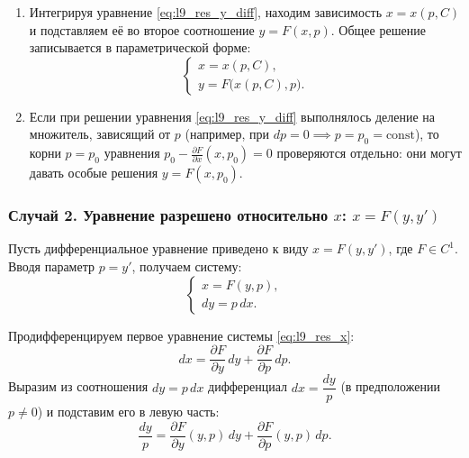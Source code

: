 \begin{enumerate}
    \item Интегрируя уравнение \eqref{eq:l9_res_y_diff}, находим зависимость
    $x = x(p, C)$ и подставляем её во второе соотношение $y = F(x, p)$. Общее
    решение записывается в параметрической форме:
    \begin{equation} \label{eq:l9_res_y_ans}
        \begin{cases}
            x = x(p, C), \\
            y = F\bigl(x(p, C), p\bigr).
        \end{cases} \tag{9}
    \end{equation}
    \item Если при решении уравнения \eqref{eq:l9_res_y_diff} выполнялось
    деление на множитель, зависящий от $p$ (например, при $dp = 0 \implies
    p = p_0 = \text{const}$), то корни $p = p_0$ уравнения
    $p_0 - \frac{\partial F}{\partial x}(x, p_0) = 0$ проверяются отдельно: они
    могут давать особые решения $y = F(x, p_0)$.
\end{enumerate}

\subsubsection{Случай 2. Уравнение разрешено относительно $x$: $x = F(y, y')$}

Пусть дифференциальное уравнение приведено к виду $x = F(y, y')$, где
$F \in C^1$. Вводя параметр $p = y'$, получаем систему:
\begin{equation} \label{eq:l9_res_x}
    \begin{cases}
        x = F(y, p), \\
        dy = p \, dx.
    \end{cases} \tag{10}
\end{equation}

Продифференцируем первое уравнение системы \eqref{eq:l9_res_x}:
\[
    dx = \frac{\partial F}{\partial y} \, dy +
    \frac{\partial F}{\partial p} \, dp.
\]
Выразим из соотношения $dy = p \, dx$ дифференциал $dx = \dfrac{dy}{p}$ (в
предположении $p \neq 0$) и подставим его в левую часть:
\begin{equation} \label{eq:l9_res_x_diff}
    \frac{dy}{p} = \frac{\partial F}{\partial y}(y, p) \, dy +
    \frac{\partial F}{\partial p}(y, p) \, dp. \tag{11}
\end{equation}

